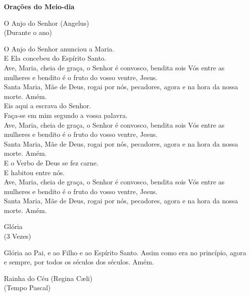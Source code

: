 \newpage
\begin{center}
    \textbf{Orações do Meio-dia}
\end{center}
\begin{center}
    O Anjo do Senhor (Angelus) \\ \textcolor{VioletRed2}{\scriptsize{(Durante o ano)}}
\end{center}
\begin{flushleft}
    \VbarRed{} O Anjo do Senhor anunciou a Maria. \\
    \RbarRed{} E Ela concebeu do Espírito Santo. \\
    \VbarRed{} Ave, Maria, cheia de graça, o Senhor é convosco, bendita sois Vós entre as mulheres e bendito é o fruto do vosso ventre, Jesus. \\
    \RbarRed{} Santa Maria, Mãe de Deus, rogai por nós, pecadores, agora e na hora da nossa morte. Amém.
    \vspace{.2cm} \\
    \VbarRed{} Eis aqui a escrava do Senhor. \\
    \RbarRed{} Faça-se em mim segundo a vossa palavra. \\
    \VbarRed{} Ave, Maria, cheia de graça, o Senhor é convosco, bendita sois Vós entre as mulheres e bendito é o fruto do vosso ventre, Jesus. \\
    \RbarRed{} Santa Maria, Mãe de Deus, rogai por nós, pecadores, agora e na hora da nossa morte. Amém.
    \vspace{.2cm} \\
    \VbarRed{} E o Verbo de Deus se fez carne. \\
    \RbarRed{} E habitou entre nós. \\
    \VbarRed{} Ave, Maria, cheia de graça, o Senhor é convosco, bendita sois Vós entre as mulheres e bendito é o fruto do vosso ventre, Jesus. \\
    \RbarRed{} Santa Maria, Mãe de Deus, rogai por nós, pecadores, agora e na hora da nossa morte. Amém.
\end{flushleft}
\begin{center}
    Glória \\ \textcolor{VioletRed2}{\scriptsize{(3 Vezes)}}
\end{center}
\begin{flushleft}
    Glória ao Pai, e ao Filho e ao Espírito Santo. Assim como era no princípio, agora e sempre, por todos os séculos dos séculos. Amém.
\end{flushleft}
\newpage
\begin{center}
    Rainha do Céu (Regina Cæli) \\ \textcolor{VioletRed2}{\scriptsize{(Tempo Pascal)}}
\end{center}
